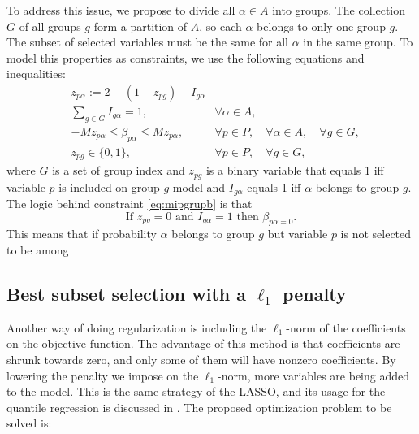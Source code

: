 To address this issue, we propose to divide all $\alpha \in A$ into groups. The collection $G$ of all groups $g$ form a partition of $A$, so each $\alpha$ belongs to only one group $g$. 
The subset of selected variables must be the same for all $\alpha$ in the same group. To model this properties as constraints, we use the following equations and inequalities:
\begin{eqnarray}
&z_{p \alpha} := 2 - ( 1-z_{pg}) - I_{g\alpha}& \\
& \sum\limits_{g \in G} I_{g\alpha} = 1, & \forall \alpha \in A,\label{eq:mipgrupa} \\
& -Mz_{p \alpha}  \leq  \beta_{p \alpha} \leq M z_{p \alpha}, & \forall p \in P, \quad \forall \alpha \in A, \quad \forall g \in G, \label{eq:mipgrupb} \\
&z_{pg} \in \{0,1\},& \forall p \in P, \quad \forall g \in G, 
\end{eqnarray}
where $G$ is a set of group index and $z_{pg}$ is a binary variable that equals 1 iff variable $p$ is included on group $g$ model and $I_{g\alpha}$ equals 1 iff $\alpha$ belongs to group $g$.
The logic behind constraint \ref{eq:mipgrupb} is that 
$$\text{If }z_{pg} = 0 \text{ and }I_{g\alpha} =1 \text{ then } \beta_{p \alpha = 0}. $$
This means that if probability $\alpha$ belongs to group $g$ but variable $p$ is not selected to be among


\subsection{Best subset selection with a $\ell_1$ penalty}
\label{sec:best-subset-ell1}

Another way of doing regularization is including the $\ell_1$-norm of the coefficients on the objective function. The advantage of this method is that coefficients are shrunk towards zero, and only some of them will have nonzero coefficients. By lowering the penalty we impose on the $\ell_1$-norm, more variables are being added to the model. 
This is the same strategy of the LASSO, and its usage for the quantile regression is discussed in \cite{li2012l1}.
The proposed optimization problem to be solved is:


